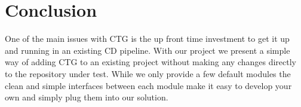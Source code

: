 \documentclass[12pt, a4paper]{article}
\begin{document}
\section{Conclusion}
One of the main issues with CTG is the up front time investment to get it up and running in an existing CD pipeline. With our project we present a simple way of adding CTG to an existing project without making any changes directly to the repository under test. While we only provide a few default modules the clean and simple interfaces between each module make it easy to develop your own and simply plug them into our solution.



\newpage
{} %
\printbibliography %



\end{document}
